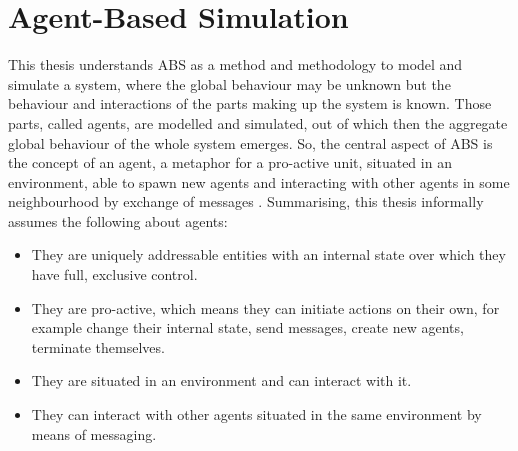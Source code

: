 \section{Agent-Based Simulation}
\label{sec:method_abs}


This thesis understands ABS as a method and methodology to model and simulate a system, where the global behaviour may be unknown but the behaviour and interactions of the parts making up the system is known. Those parts, called agents, are modelled and simulated, out of which then the aggregate global behaviour of the whole system emerges. So, the central aspect of ABS is the concept of an agent, a metaphor for a pro-active unit, situated in an environment, able to spawn new agents and interacting with other agents in some neighbourhood by exchange of messages \cite{macal_everything_2016, odell_objects_2002, siebers_introduction_2008, wooldridge_introduction_2009}. Summarising, this thesis informally assumes the following about agents:

\begin{itemize}
	\item They are uniquely addressable entities with an internal state over which they have full, exclusive control.
	\item They are pro-active, which means they can initiate actions on their own, for example change their internal state, send messages, create new agents, terminate themselves.
	\item They are situated in an environment and can interact with it.
	\item They can interact with other agents situated in the same environment by means of messaging.
\end{itemize} 

